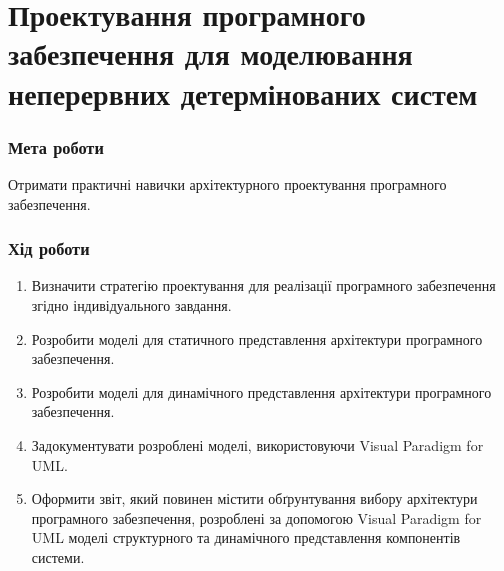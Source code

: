 


\newcommand{\labnumber}{3} %



\graphicspath{{figures/}}


\Ukrainian


\addtocounter{page}{1}

\section*{Проектування програмного забезпечення для моделювання неперервних детермінованих систем}
\subsubsection*{Мета роботи}
Отримати практичні навички архітектурного проектування
програмного забезпечення.
\subsubsection*{Хід роботи}
\begin{enumerate}
\item Визначити стратегію проектування для реалізації програмного забезпечення згідно індивідуального завдання.
\item Розробити моделі для статичного представлення архітектури програмного забезпечення.
\item Розробити моделі для динамічного представлення архітектури програмного забезпечення.
\item Задокументувати розроблені моделі, використовуючи Visual Paradigm for UML.
\item Оформити звіт, який повинен містити обґрунтування вибору архітектури програмного забезпечення, розроблені за допомогою Visual Paradigm for UML моделі структурного та динамічного представлення компонентів системи.
\end{enumerate}


